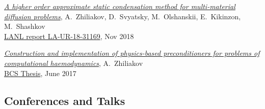 \documentclass[a4paper,12pt]{article}
\begin{document}
\begin{etaremune}[topsep=0pt]
		\item \textit{\href{https://www.researchgate.net/publication/329327346_A_higher_order_approximate_static_condensation_method_for_multi-material_diffusion_problems}{A higher order approximate static condensation method for multi-material diffusion problems}}, A.~Zhiliakov, D.~Svyatsky, M.~Olshanskii, E.~Kikinzon, M.~Shashkov\\ \href{https://permalink.lanl.gov/object/tr?what=info:lanl-repo/lareport/LA-UR-18-31169}{LANL report LA-UR-18-31169}, Nov 2018 
		\item \textit{\href{https://www.researchgate.net/publication/318039077_Postroenie_i_realizacia_fiziceskih_pereobuslavlivatelej_dla_zadac_vycislitelnoj_gemodinamiki}{Construction and implementation of physics-based preconditioners for problems of computational haemodynamics}}, A.~Zhiliakov\\ \href{https://elibrary.nstu.ru/source?id=61216}{BCS Thesis}, June 2017   
%			
%			
	\end{etaremune}

	\subsection*{Conferences and Talks}
	
\end{document}
